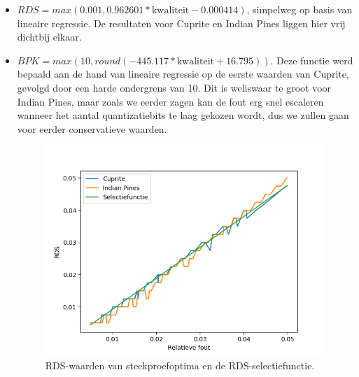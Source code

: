 \begin{itemize}
\item $RDS = max(0.001, 0.962601*\text{kwaliteit} - 0.000414)$, simpelweg op basis van lineaire regressie. De resultaten voor Cuprite en Indian Pines liggen hier vrij dichtbij elkaar.
\item $BPK = max(10, round(-445.117*\text{kwaliteit} + 16.795))$. Deze functie werd bepaald aan de hand van lineaire regressie op de eerste waarden van Cuprite, gevolgd door een harde ondergrens van 10. Dit is weliswaar te groot voor Indian Pines, maar zoals we eerder zagen kan de fout erg snel escaleren wanneer het aantal quantizatiebits te laag gekozen wordt, dus we zullen gaan voor eerder conservatieve waarden.
\newpage

\begin{figure}[H]
  \centering
  \includegraphics[scale=0.7]{images/filtered_sweep_points_RDS.png}
  \caption{RDS-waarden van steekproefoptima en de RDS-selectiefunctie.}
  \label{fig:filtered_sweep_points_RDS}
\end{figure}


\end{itemize}
